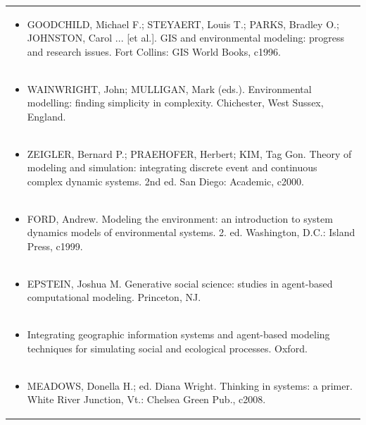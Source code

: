 \documentclass[11pt]{article}
\begin{document}
\begin{center}
\begin{longtable}{|p{4cm}|p{4cm}|p{4cm}|p{4cm}|}
\multicolumn{4}{|p{\dimexpr 16cm + 6\tabcolsep\relax}|}{\begin{itemize}\item GOODCHILD, Michael F.; STEYAERT, Louis T.; PARKS, Bradley O.; JOHNSTON, Carol ... [et al.]. GIS and environmental modeling: progress and research issues. Fort Collins: GIS World Books, c1996.\end{itemize}}\\
\multicolumn{4}{|p{\dimexpr 16cm + 6\tabcolsep\relax}|}{\begin{itemize}\item WAINWRIGHT, John; MULLIGAN, Mark (eds.). Environmental modelling: finding simplicity in complexity. Chichester, West Sussex, England.\end{itemize}}\\
\multicolumn{4}{|p{\dimexpr 16cm + 6\tabcolsep\relax}|}{\begin{itemize}\item ZEIGLER, Bernard P.; PRAEHOFER, Herbert; KIM, Tag Gon. Theory of modeling and simulation: integrating discrete event and continuous complex dynamic systems. 2nd ed. San Diego: Academic, c2000.\end{itemize}}\\
\multicolumn{4}{|p{\dimexpr 16cm + 6\tabcolsep\relax}|}{\begin{itemize}\item FORD, Andrew. Modeling the environment: an introduction to system dynamics models of environmental systems. 2. ed. Washington, D.C.: Island Press, c1999.\end{itemize}}\\
\multicolumn{4}{|p{\dimexpr 16cm + 6\tabcolsep\relax}|}{\begin{itemize}\item EPSTEIN, Joshua M. Generative social science: studies in agent-based computational modeling. Princeton, NJ.\end{itemize}}\\
\multicolumn{4}{|p{\dimexpr 16cm + 6\tabcolsep\relax}|}{\begin{itemize}\item Integrating geographic information systems and agent-based modeling techniques for simulating social and ecological processes. Oxford.\end{itemize}}\\
\multicolumn{4}{|p{\dimexpr 16cm + 6\tabcolsep\relax}|}{\begin{itemize}\item MEADOWS, Donella H.; ed. Diana Wright. Thinking in systems: a primer. White River Junction, Vt.: Chelsea Green Pub., c2008.\end{itemize}}\\

\end{longtable}
\end{center}
\end{document}
